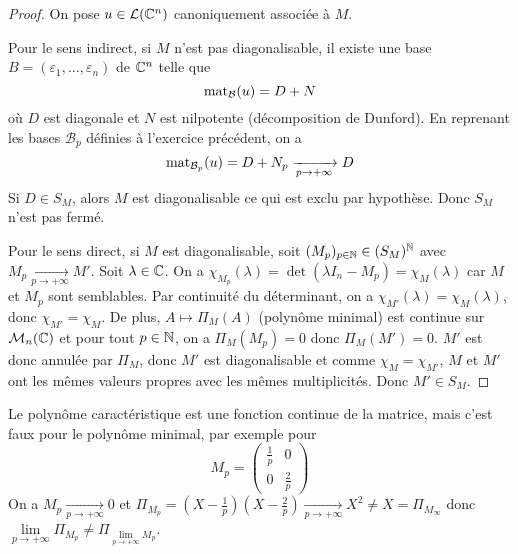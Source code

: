 \begin{proof}
	On pose $u\in\mathcal{L}(\mathbb{C}^{n})$ canoniquement associée à $M$. 

	Pour le sens indirect, si $M$ n'est pas diagonalisable, il existe une base $B=(\varepsilon_{1},\dots,\varepsilon_{n})$ de $\mathbb{C}^{n}$ telle que 
	\begin{equation}\operatorname{mat}\limits_{\mathcal{B}}(u)=D+N\end{equation}
	où $D$ est diagonale et $N$ est nilpotente (décomposition de Dunford). En reprenant les bases $\mathcal{B}_{p}$ définies à l'exercice précédent, on a
	\begin{equation}\operatorname{mat}\limits_{\mathcal{B}_{p}}(u)=D+N_{p}\xrightarrow[p\to+\infty]{}D\end{equation}
	Si $D\in S_{M}$, alors $M$ est diagonalisable ce qui est exclu par hypothèse. Donc $S_{M}$ n'est pas fermé.

	Pour le sens direct, si $M$ est diagonalisable, soit $(M_{p})_{p\in\mathbb{N}}\in(S_{M})^{\mathbb{N}}$ avec $M_{p}\xrightarrow[p\to+\infty]{}M'$. Soit $\lambda\in\mathbb{C}$. On a $\chi_{M_{p}}(\lambda)=\det(\lambda I_{n}-M_{p})=\chi_{M}(\lambda)$ car $M$ et $M_{p}$ sont semblables. Par continuité du déterminant, on a $\chi_{M'}(\lambda)=\chi_{M}(\lambda)$, donc $\chi_{M'}=\chi_{M}$. De plus, $A\mapsto\Pi_{M}(A)$ (polynôme minimal) est continue sur $\mathcal{M}_{n}(\mathbb{C})$ et pour tout $p\in\mathbb{N}$, on a $\Pi_{M}(M_{p})=0$ donc $\Pi_{M}(M')=0$. $M'$ est donc annulée par $\Pi_{M}$, donc $M'$ est diagonalisable et comme $\chi_{M}=\chi_{M'}$, $M$ et $M'$ ont les mêmes valeurs propres avec les mêmes multiplicités. Donc $M'\in S_{M}$.
\end{proof}

\begin{remark}
	Le polynôme caractéristique est une fonction continue de la matrice, mais c'est faux pour le polynôme minimal, par exemple pour 
	\begin{equation}M_{p}=\begin{pmatrix}
		\frac{1}{p} &0\\
		0 & \frac{2}{p}
	\end{pmatrix}\end{equation}
	On a $M_{p}\xrightarrow[p\to+\infty]{}0$ et $\Pi_{M_{p}}=(X-\frac{1}{p})(X-\frac{2}{p})\xrightarrow[p\to+\infty]{} X^{2}\neq X=\Pi_{M_{\infty}}$ donc $\lim\limits_{p\to+\infty}\Pi_{M_p}\neq\Pi_{\lim\limits_{p\to+\infty}M_{p}}$.
\end{remark}

